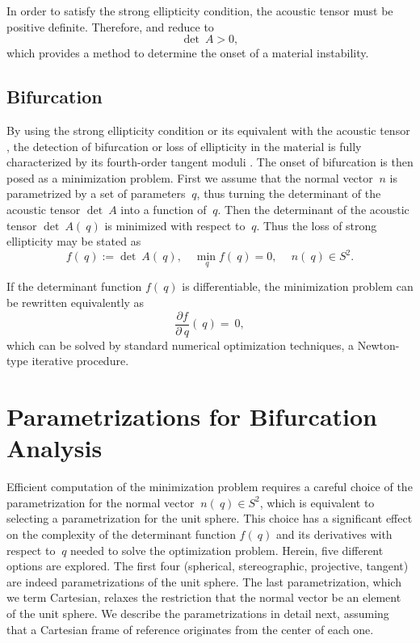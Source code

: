 \documentclass[12pt]{article}
\numberwithin{equation}{section}
\begin{document}
In order to satisfy the strong ellipticity condition, the acoustic
tensor must be positive definite. Therefore,
 and  reduce
to
\begin{equation} \label{eq:acoustic-determinant}
  \det ~A > 0,
\end{equation}
which provides a method to determine the onset of a material
instability.

\subsection{Bifurcation}

By using the strong ellipticity condition
 or its equivalent with the acoustic
tensor , the detection of bifurcation
or loss of ellipticity in the material is fully characterized by its
fourth-order tangent moduli . The
onset of bifurcation is then posed as a minimization problem.  First
we assume that the normal vector $~n$ is parametrized by a set of
parameters $~q$, thus turning the determinant of the acoustic tensor
$\det ~A$ into a function of $~q$.  Then the determinant of the
acoustic tensor $\det ~A(~q)$ is minimized with respect to
$~q$. Thus the loss of strong ellipticity may be stated as
\begin{equation} \label{eq:minimization-determinant}
  f(~q) := \det ~A(~q),
  \quad
  \min_{~q} f(~q) = 0,
  \quad
  ~n(~q) \in S^2.
\end{equation}

If the determinant function $f(~q)$ is differentiable, the
minimization problem can be rewritten equivalently as
\begin{equation}\label{eq:minimization-derivative}
  \frac{\partial f}{\partial ~q}(~q) = ~0,
\end{equation}
which can be solved by standard numerical optimization techniques, \eg
a Newton-type iterative procedure.

\section{Parametrizations for Bifurcation Analysis}
\label{sec:parametrizations}

Efficient computation of the minimization problem
 requires a careful choice of the
parametrization for the normal vector $~n(~q) \in S^2$, which is
equivalent to selecting a parametrization for the unit sphere. This
choice has a significant effect on the complexity of the determinant
function $f(~q)$ and its derivatives with respect to $~q$ needed to
solve the optimization problem. Herein, five different options are
explored. The first four (spherical, stereographic, projective,
tangent) are indeed parametrizations of the unit sphere.  The last
parametrization, which we term Cartesian, relaxes the restriction that
the normal vector be an element of the unit sphere. We describe the
parametrizations in detail next, assuming that a Cartesian frame of
reference originates from the center of each one.
\end{document}
